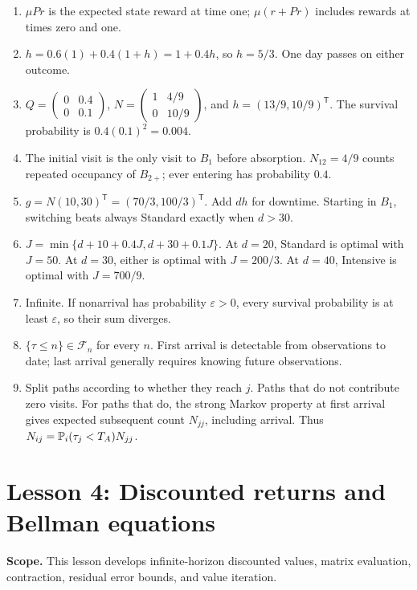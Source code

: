 \documentclass[11pt]{article}
\theoremstyle{remark}\newtheorem{remark}[definition]{Remark}
\begin{document}
\begin{enumerate}
\item $\mu Pr$ is the expected state reward at time one; $\mu(r+Pr)$ includes rewards at times zero and one.
\item $h=0.6(1)+0.4(1+h)=1+0.4h$, so $h=5/3$. One day passes on either outcome.
\item $Q=\left(\begin{smallmatrix}0&0.4\\0&0.1\end{smallmatrix}\right)$,
$N=\left(\begin{smallmatrix}1&4/9\\0&10/9\end{smallmatrix}\right)$,
and $h=(13/9,10/9)^{\mathsf T}$. The survival probability is $0.4(0.1)^2=0.004$.
\item The initial visit is the only visit to $B_1$ before absorption. $N_{12}=4/9$ counts repeated occupancy of $B_{2+}$; ever entering has probability $0.4$.
\item $g=N(10,30)^{\mathsf T}=(70/3,100/3)^{\mathsf T}$. Add $dh$ for downtime. Starting in $B_1$, switching beats always Standard exactly when $d>30$.
\item $J=\min\{d+10+0.4J,d+30+0.1J\}$. At $d=20$, Standard is optimal with $J=50$. At $d=30$, either is optimal with $J=200/3$. At $d=40$, Intensive is optimal with $J=700/9$.
\item Infinite. If nonarrival has probability $\varepsilon>0$, every survival probability is at least $\varepsilon$, so their sum diverges.
\item $\{\tau\leq n\}\in\mathcal F_n$ for every $n$. First arrival is detectable from observations to date; last arrival generally requires knowing future observations.
\item Split paths according to whether they reach $j$. Paths that do not contribute zero visits. For paths that do, the strong Markov property at first arrival gives expected subsequent count $N_{jj}$, including arrival. Thus $N_{ij}=\mathbb P_i(\tau_j<T_A)N_{jj}$.
\end{enumerate}


\clearpage
{}
\section{Lesson 4: Discounted returns and Bellman equations}
\textbf{Scope.} This lesson develops infinite-horizon discounted values, matrix evaluation, contraction, residual error bounds, and value iteration.
\end{document}
